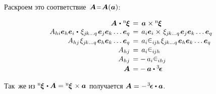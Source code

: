 \begin{otherlanguage}{russian}
Раскроем это соответствие~${\bm{A} \narroweq \bm{A}(\bm{a})}$:

\nopagebreak\vspace{-0.1em}\begin{equation*}
\begin{array}{r@{\hspace{1ex}}c@{\hspace{1ex}}l}
\bm{A} \hspace{.2ex}\dotp\hspace{.1ex} {^\mathrm{n}\hspace{-0.12ex}\bm{\xi}} & = & \bm{a} \hspace{.1ex} \times {^\mathrm{n}\hspace{-0.12ex}\bm{\xi}}
\\
%
A_{hi} \bm{e}_h \bm{e}_i \hspace{.1ex}\dotp\hspace{.25ex} \xi_{j\hspace{-0.1ex}k \ldots q} \hspace{.2ex} \bm{e}_j \bm{e}_k \ldots \bm{e}_q & = & a_{i} \bm{e}_i \times\hspace{.2ex} \xi_{j\hspace{-0.1ex}k \ldots q} \hspace{.2ex} \bm{e}_j \bm{e}_k \ldots \bm{e}_q
\\[.1em]
%
A_{hj} \hspace{.2ex} \xi_{j\hspace{-0.1ex}k \ldots q} \hspace{.2ex} \bm{e}_h \bm{e}_k \ldots \bm{e}_q & = & a_{i} \levicivita_{i\hspace{-0.1ex}jh} \hspace{.2ex} \xi_{j\hspace{-0.1ex}k \ldots q} \hspace{.2ex} \bm{e}_h \bm{e}_k \ldots \bm{e}_q
\\[.1em]
%
A_{hj} & = & a_{i} \levicivita_{i\hspace{-0.1ex}jh}
\\[.1em]
%
A_{hj} & = & \! - \, a_{i} \levicivita_{ihj}
\\[.2em]
%
\bm{A} & = & \! - \, \bm{a} \dotp \levicivitatensor
\end{array}
\end{equation*}

Так~же из ${{^\mathrm{n}\hspace{-0.12ex}\bm{\xi}} \hspace{.2ex} \dotp \bm{A} = {^\mathrm{n}\hspace{-0.12ex}\bm{\xi}} \hspace{.2ex}\times \bm{a}}$ получается ${\bm{A} = - \hspace{.2ex} \levicivitatensor \dotp \bm{a}}$.


\end{otherlanguage}
